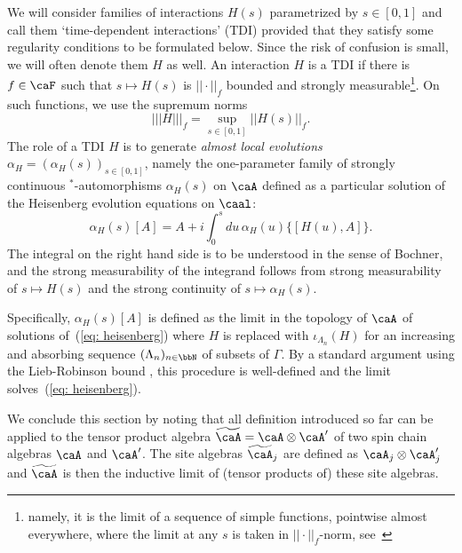 We will consider families of interactions $H(s)$ parametrized by $s\in [0,1]$ and call them `time-dependent interactions' (TDI) provided that they satisfy some regularity conditions to be formulated below. Since the risk of confusion is small, we will often denote them $H$ as well. An interaction $H$ is a TDI if there is $f\in\caF$ such that $s\mapsto H(s)$ is $||\cdot||_f$ bounded and strongly measurable\footnote{namely, it is the limit of a sequence of simple functions, pointwise almost everywhere, where the limit at any $s$ is taken in $||\cdot||_f$-norm, see~\cite{diestel1978vector} }.  On such functions, we use the supremum norms 
$$
|||H |||_{f}=\sup_{s\in[0,1]} ||H(s)||_{f}.
$$
The role of a TDI $H$ is to generate \emph{almost local evolutions} $\alpha_H=(\alpha_H(s))_{s\in[0,1]}$, namely the one-parameter family of strongly continuous $^*$-automorphisms $\alpha_H(s)$ on $\caA$ defined as a particular solution of the Heisenberg evolution equations on $\caal$:
\begin{equation}\label{eq: heisenberg}
\alpha_H(s)[A]= A +i\int_0^s du\, \alpha_H(u) \{ [H(u),A] \}.
\end{equation} 
The integral on the right hand side is to be understood in the sense of Bochner, and the strong measurability of the integrand follows from strong measurability of $s\mapsto H(s)$ and the strong continuity of $s\mapsto \alpha_H(s)$. 

Specifically, $\alpha_H(s)[A]$ is defined as the limit in the topology of $\caA$ of solutions of~(\ref{eq: heisenberg}) where $H$ is replaced with $\iota_{\Lambda_n}(H)$ for an increasing and absorbing sequence $(\Lambda_n)_{n\in\bbN}$ of subsets of $\Gamma$. By a standard argument using the Lieb-Robinson bound \cite{Lieb:1972ts,nachtergaele2006propagation}, this procedure is well-defined and the limit solves~(\ref{eq: heisenberg}). 


We conclude this section by noting that all definition introduced so far can be applied to the tensor product algebra $\widetilde \caA= \caA \otimes  \caA'$ of two spin chain algebras $\caA$ and $\caA'$. The site algebras $\widetilde \caA_j$ are defined as $\caA_j\otimes\caA'_j$ and $\widetilde\caA$ is then the inductive limit of (tensor products of) these site algebras.


